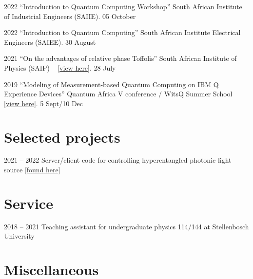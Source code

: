 \documentclass[letterpaper, 11pt]{report}
\begin{document}
    \begin{tablist}
          \item[2022] \tab{}\enquote{Introduction to Quantum Computing Workshop} South African Institute of Industrial Engineers (SAIIE). 05 October
          \item[2022] \tab{}\enquote{Introduction to Quantum Computing} South African Institute Electrical Engineers (SAIEE). 30 August
          \item[2021] \tab{}\enquote{On the advantages of relative phase Toffolis} South
            African Institute of Physics (SAIP)
            ~ [\href{https://github.com/Unathi-Skosana/posters-n-presentations/blob/main/posters/witsq-summer-school-2019/release/poster.pdf}{view
            here}]. 28 July
          \item[2019] \tab{}\enquote{Modeling of Measurement-based Quantum Computing on
            IBM Q Experience Devices} Quantum Africa V conference / WitsQ Summer School
            [\href{https://github.com/Unathi-Skosana/posters-n-presentations/blob/main/posters/witsq-summer-school-2019/release/poster.pdf}{view
            here}].
            5 Sept/10 Dec
    \end{tablist}

    \section*{Selected projects}

    \begin{tablist}
      \item[2021 -- 2022] \tab{} Server/client code for controlling hyperentangled photonic light source
        [\href{https://github.com/Unathi-Skosana/hyperentangled-photons-masters-experiment}{found
        here}]
    \end{tablist}

    \section*{Service}

    \begin{tablist}
      \item[2018 -- 2021] \tab{} Teaching assistant for undergraduate physics 114/144 at Stellenbosch University
    \end{tablist}

    \section*{Miscellaneous}
\end{document}
